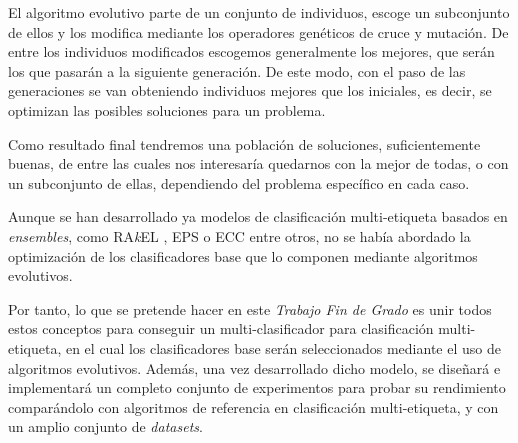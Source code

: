 El algoritmo evolutivo parte de un conjunto de individuos, escoge un subconjunto de ellos y los modifica mediante los operadores genéticos de cruce y mutación. De entre los individuos modificados escogemos generalmente los mejores, que serán los que pasarán a la siguiente generación. De este modo, con el paso de las generaciones se van obteniendo individuos mejores que los iniciales, es decir, se optimizan las posibles soluciones para un problema.

Como resultado final tendremos una población de soluciones, suficientemente buenas, de entre las cuales nos interesaría quedarnos con la mejor de todas, o con un subconjunto de ellas, dependiendo del problema específico en cada caso.

Aunque se han desarrollado ya modelos de clasificación multi-etiqueta basados en \textit{ensembles}, como RA\textit{k}EL \cite{RAKEL}, EPS \cite{EPS} o ECC \cite{ECC} entre otros, no se había abordado la optimización de los clasificadores base que lo componen mediante algoritmos evolutivos.

Por tanto, lo que se pretende hacer en este \textit{Trabajo Fin de Grado} es unir todos estos conceptos para conseguir un multi-clasificador para clasificación multi-etiqueta, en el cual los clasificadores base serán seleccionados mediante el uso de algoritmos evolutivos. Además, una vez desarrollado dicho modelo, se diseñará e implementará un completo conjunto de experimentos para probar su rendimiento comparándolo con algoritmos de referencia en clasificación multi-etiqueta, y con un amplio conjunto de \textit{datasets}.



